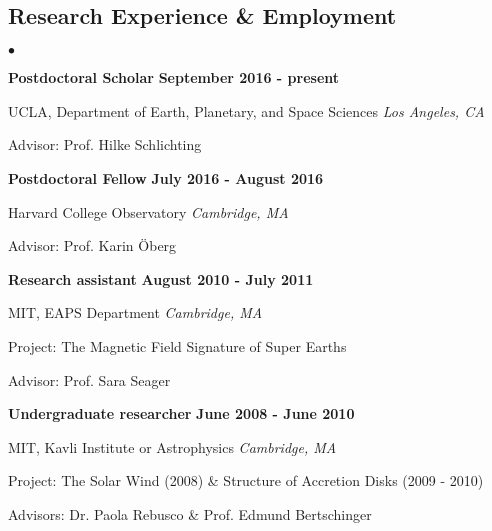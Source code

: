 \documentclass[margin,line]{res}
\newenvironment{list1}{
  \begin{list}{\ding{113}}{%
      \setlength{\itemsep}{0in}
      \setlength{\parsep}{0in} \setlength{\parskip}{0in}
      \setlength{\topsep}{0in} \setlength{\partopsep}{0in} 
      \setlength{\leftmargin}{0.17in}}}{\end{list}}
\newenvironment{list2}{
  \begin{list}{$\bullet$}{%
      \setlength{\itemsep}{0in}
      \setlength{\parsep}{0in} \setlength{\parskip}{0in}
      \setlength{\topsep}{0in} \setlength{\partopsep}{0in} 
      \setlength{\leftmargin}{0.2in}}}{\end{list}}
\begin{document}
\begin{resume}
\section{\sc Research Experience \& Employment}
\begin{list2}

\item[] {\bf Postdoctoral Scholar} \hfill {\bf September 2016 - present}
\begin{list1}
\item[] UCLA, Department of Earth, Planetary, and Space Sciences \hfill \textit{Los Angeles, CA}
\item[] Advisor: Prof. Hilke Schlichting \\
\end{list1}

\item[] {\bf Postdoctoral Fellow} \hfill {\bf July 2016 - August 2016}
\begin{list1}
\item[] Harvard College Observatory  \hfill \textit{Cambridge, MA}
\item[] Advisor: Prof. Karin \"Oberg \\
\end{list1}

\item[] {\bf Research assistant} \hfill {\bf August 2010 - July 2011}
\begin{list1}
\item[] MIT, EAPS Department \hfill \textit{Cambridge, MA}
\item[] Project: The Magnetic Field Signature of Super Earths
\item[] Advisor: Prof. Sara Seager \\
\end{list1}

\item[] {\bf Undergraduate researcher} \hfill {\bf June 2008 - June 2010}
\begin{list1}
\item[] MIT, Kavli Institute or Astrophysics \hfill \textit{Cambridge, MA}
\item[] Project: The Solar Wind (2008) \& Structure of Accretion Disks (2009 - 2010)
\item[] Advisors: Dr. Paola Rebusco \& Prof. Edmund Bertschinger \\
\end{list1}


\end{list2}
\end{resume}
\end{document}
